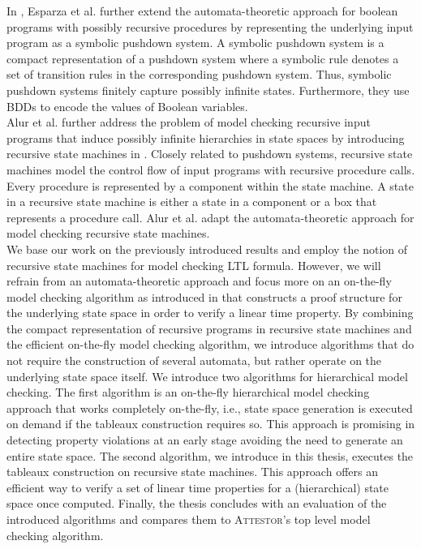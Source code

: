 \documentclass[a4paper, 12pt, twoside]{report}
\begin{document}
	In \cite{schwoon2001}, Esparza et al. further extend the automata-theoretic approach for boolean programs with possibly recursive procedures by representing the underlying input program as a symbolic pushdown system. A symbolic pushdown system is a compact representation of a pushdown system where a symbolic rule denotes a set of transition rules in the corresponding pushdown system. Thus, symbolic pushdown systems finitely capture possibly infinite states. Furthermore, they use BDDs to encode the values of Boolean variables.\\
	
	Alur et al. further address the problem of model checking recursive input programs that induce possibly infinite hierarchies in state spaces by introducing recursive state machines in \cite{alur2001analysis}. Closely related to pushdown systems, recursive state machines model the control flow of input programs with recursive procedure calls. Every procedure is represented by a component within the state machine. A state in a recursive state machine is either a state in a component or a box that represents a procedure call. Alur et al. adapt the automata-theoretic approach for model checking recursive state machines.\\
	
	We base our work on the previously introduced results and employ the notion of recursive state machines for model checking LTL formula. However, we will refrain from an automata-theoretic approach and focus more on an on-the-fly model checking algorithm as introduced in \cite{bhat1995efficient} that constructs a proof structure for the underlying state space in order to verify a linear time property. By combining the compact representation of recursive programs in recursive state machines and the efficient on-the-fly model checking algorithm, we introduce algorithms that do not require the construction of several automata, but rather operate on the underlying state space itself. We introduce two algorithms for hierarchical model checking. The first algorithm is an on-the-fly hierarchical model checking approach that works completely on-the-fly, i.e., state space generation is executed on demand if the tableaux construction requires so. This approach is promising in detecting property violations at an early stage avoiding the need to generate an entire state space. The second algorithm, we introduce in this thesis, executes the tableaux construction on recursive state machines. This approach offers an efficient way to verify a set of linear time properties for a (hierarchical) state space once computed. Finally, the thesis concludes with an evaluation of the introduced algorithms and compares them to \textsc{Attestor}'s top level model checking algorithm. 
	
\end{document}
